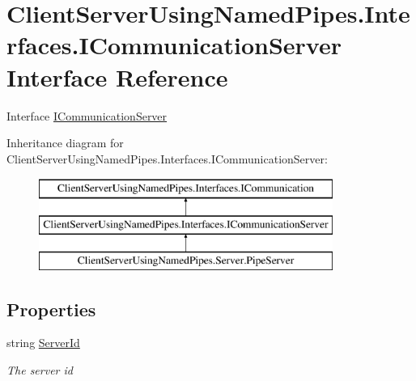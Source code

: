 \hypertarget{interface_client_server_using_named_pipes_1_1_interfaces_1_1_i_communication_server}{}\section{Client\+Server\+Using\+Named\+Pipes.\+Interfaces.\+I\+Communication\+Server Interface Reference}
\label{interface_client_server_using_named_pipes_1_1_interfaces_1_1_i_communication_server}


Interface \hyperlink{interface_client_server_using_named_pipes_1_1_interfaces_1_1_i_communication_server}{I\+Communication\+Server}  


Inheritance diagram for Client\+Server\+Using\+Named\+Pipes.\+Interfaces.\+I\+Communication\+Server\+:\begin{figure}[H]
\begin{center}
\leavevmode
\includegraphics[height=3.000000cm]{interface_client_server_using_named_pipes_1_1_interfaces_1_1_i_communication_server}
\end{center}
\end{figure}
\subsection*{Properties}
\begin{DoxyCompactItemize}
\item 
string \hyperlink{interface_client_server_using_named_pipes_1_1_interfaces_1_1_i_communication_server_a228f8ff6706a75110542feb9790d68e1}{Server\+Id}
\begin{DoxyCompactList}\small\item\em The server id \end{DoxyCompactList}\end{DoxyCompactItemize}
